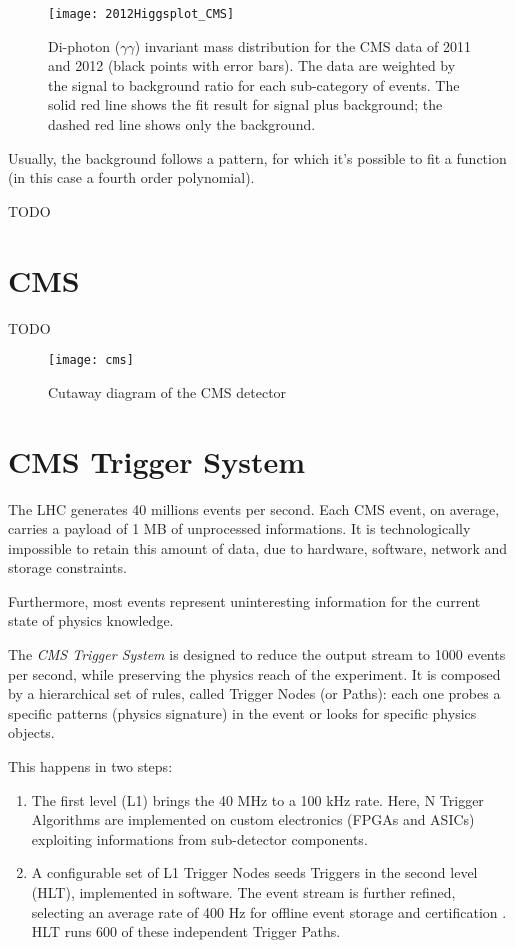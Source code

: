 \begin{figure}
	\centerline{
		\texttt{[image: 2012Higgsplot\_CMS]}}
	\caption{Di-photon ($\gamma\gamma$) invariant mass distribution for the CMS data of 2011 and 2012 (black points with error bars). The data are weighted by the signal to background ratio for each sub-category of events. The solid red line shows the fit result for signal plus background; the dashed red line shows only the background. \cite{Collaboration:1459463}}
\end{figure}


Usually, the background follows a pattern, for which it's possible to fit a function (in this case a fourth order polynomial).

TODO


\section{CMS}

TODO

\begin{figure}

	\centerline{
		\texttt{[image: cms]}}
	\caption{Cutaway diagram of the CMS detector \cite{Sakuma_2014}}
	\label{fig:cms}
\end{figure}

\section{CMS Trigger System}


The LHC generates 40 millions events per second. Each CMS event, on average, carries a payload of 1 MB of unprocessed informations. It is technologically impossible to retain this amount of data, due to hardware, software, network and storage constraints.

Furthermore, most events represent uninteresting information for the current state of physics knowledge.

The \textit{CMS Trigger System} is designed to reduce the output stream to 1000 events per second, while preserving the physics reach of the experiment.
It is composed by a hierarchical set of rules, called Trigger Nodes (or Paths): each one probes a specific patterns (physics signature) in the event or looks for specific physics objects.

This happens in two steps:

\begin{enumerate}

	\item The first level (L1) \cite{Bayatyan:706847} brings the 40 MHz to a 100 kHz rate. Here, N Trigger Algorithms are implemented on custom electronics (FPGAs and ASICs) exploiting informations from sub-detector components.

	\item A configurable set of L1 Trigger Nodes seeds Triggers in the second level (HLT), implemented in software. The event stream is further refined, selecting an average rate of 400 Hz for offline event storage and certification \cite{Khachatryan_2017}. HLT runs 600 of these independent Trigger Paths.

\end{enumerate}